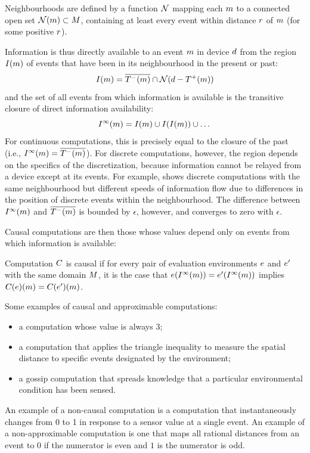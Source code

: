 \documentclass[12pt,a4paper,twoside,openright]{book}
\begin{document}
\begin{thrdefn}[Neighbourhood]\label{def:neighbourhood}
  Neighbourhoods are defined by a function $\mathcal{N}$ mapping each $m$ to a connected open set $\mathcal{N}(m) \subset M$, containing at least every event within distance $r$ of $m$ (for some positive $r$).
\end{thrdefn}
\noindent
Information is thus directly available to an event $m$ in device $d$ from the region $I(m)$ of events that have been in its neighbourhood in the present or past:
%
$$I(m) = \overline{T^-({m})} \cap \mathcal{N}(d-T^+({m}))$$
%
and the set of all events from which information is available is the transitive closure of direct information availability:
%
$$I^\infty(m) = I(m) \cup I(I(m)) \cup \dots$$
%
For continuous computations, this is precisely equal to the closure of the past (i.e., $I^\infty(m) = \overline{T^-({m})}$).  For discrete computations, however, the region depends on the specifics of the discretization, because information cannot be relayed from a device except at its events.
%
For example,  shows discrete computations with the same neighbourhood but different speeds of information flow due to differences in the position of discrete events within the neighbourhood.
%
The difference between $I^\infty(m)$ and $\overline{T^-({m})}$ is bounded by $\epsilon$, however, and converges to zero with $\epsilon$.

Causal computations are then those whose values depend only on events from which information is available:
\begin{thrdefn}[Causality]
  Computation $C$ is causal if for every pair of evaluation environments $e$ and $e'$ with the same domain $M$, it is the case that $e(I^\infty(m)) = e'(I^\infty(m))$ implies $C(e)(m) = C(e')(m)$.
\end{thrdefn}
\noindent
Some examples of causal and approximable computations:
\begin{itemize}
\item a computation whose value is always 3;
\item a computation that applies the triangle inequality to measure the spatial distance to specific events designated by the environment;
\item a gossip computation that spreads knowledge that a particular environmental condition has been sensed.
\end{itemize}
%
An example of a non-causal computation is a computation that instantaneously changes from 0 to 1 in response to a sensor value at a single event.  
%
An example of a non-approximable computation is one that maps all rational distances from an event to $0$ if the numerator is even and $1$ is the numerator is odd.
\end{document}
